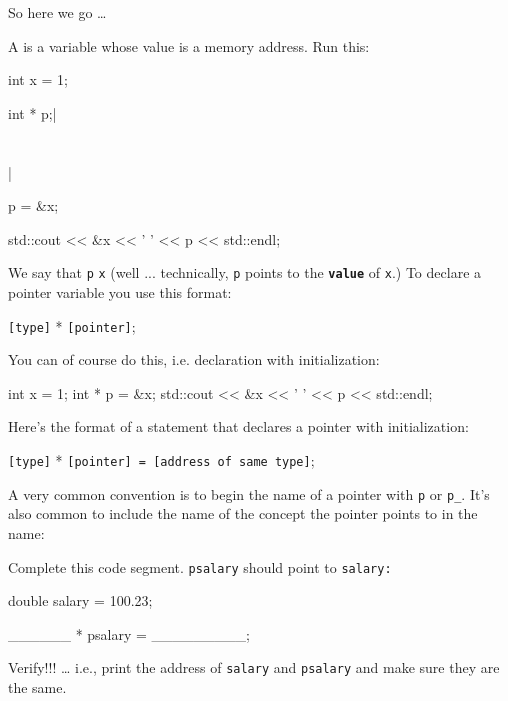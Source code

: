 So here we go \ldots{}

A  is a variable whose value is a memory
address. Run this:

\begin{consolethree}[escapeinside=||]
int x = 1;

int * p;|\\\\\\|

p = &x;         

std::cout << &x << ' ' << p << std::endl;
\end{consolethree}
\newpage
We say that \texttt{p}  \texttt{x} (well ... technically, \texttt{p} points to the \texttt{\textbf{value}} of \texttt{x}.) To declare a pointer variable you use this format:
\begin{center}
\texttt{[type]} * \texttt{[pointer]};
\end{center}
You can of course do this, i.e. declaration with initialization:

\begin{consolethree}[escapeinside=||]
int x = 1;
int * p = &x;
std::cout << &x << ' ' << p << std::endl;
\end{consolethree}
Here's the format of a statement that declares a pointer with
initialization:

\begin{center}
\texttt{[type]} * \texttt{[pointer] = [address of same type]};
\end{center}

A very common convention is to begin the name of a pointer with \texttt{p} or \texttt{p\_}. It's also common to include the name of the concept the pointer points to in the name:

\begin{ex}
Complete this code segment. \texttt{psalary} should
point to \texttt{salary:}

\begin{consolethree}[escapeinside=||]
double salary = 100.23;

______ * psalary = _________;
\end{consolethree}
Verify!!! \ldots{} i.e., print the address of \texttt{salary} and \texttt{psalary} and make sure they are the same.
\end{ex}

